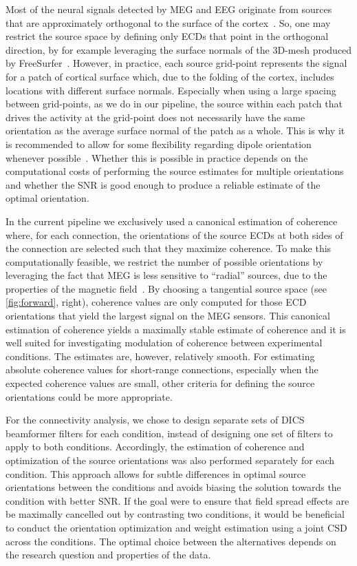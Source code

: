 \documentclass[utf8]{frontiersSCNS}
\renewcommand{\cite}[1]{~\citep{#1}}
\begin{document}
Most of the neural signals detected by MEG and EEG originate from sources that are approximately orthogonal to the surface of the cortex\cite{Hamalainen1993}.
So, one may restrict the source space by defining only ECDs that point in the orthogonal direction, by for example leveraging the surface normals of the 3D-mesh produced by FreeSurfer\cite{Dale1993}.
However, in practice, each source grid-point represents the signal for a patch of cortical surface which, due to the folding of the cortex, includes locations with different surface normals.
Especially when using a large spacing between grid-points, as we do in our pipeline, the source within each patch that drives the activity at the grid-point does not necessarily have the same orientation as the average surface normal of the patch as a whole.
This is why it is recommended to allow for some flexibility regarding dipole orientation whenever possible\cite{Lin2006}.
Whether this is possible in practice depends on the computational costs of performing the source estimates for multiple orientations and whether the SNR is good enough to produce a reliable estimate of the optimal orientation.

In the current pipeline we exclusively used a canonical estimation of coherence\cite{Saarinen2015, Liljestrom2015a, Liljestrom2015b} where, for each connection, the orientations of the source ECDs at both sides of the connection are selected such that they maximize coherence.
To make this computationally feasible, we restrict the number of possible orientations by leveraging the fact that MEG is less sensitive to ``radial'' sources, due to the properties of the magnetic field\cite{Hamalainen1993}.
By choosing a tangential source space (see \autoref{fig:forward}, right), coherence values are only computed for those ECD orientations that yield the largest signal on the MEG sensors.
This canonical estimation of coherence yields a maximally stable estimate of coherence and it is well suited for investigating modulation of coherence between experimental conditions.
The estimates are, however, relatively smooth.
For estimating absolute coherence values for short-range connections, especially when the expected coherence values are small, other criteria for defining the source orientations could be more appropriate.

For the connectivity analysis, we chose to design separate sets of DICS beamformer filters for each condition, instead of designing one set of filters to apply to both conditions.
Accordingly, the estimation of coherence and optimization of the source orientations was also performed separately for each condition.
This approach allows for subtle differences in optimal source orientations between the conditions and avoids biasing the solution towards the condition with better SNR\@.
If the goal were to ensure that field spread effects are be maximally cancelled out by contrasting two conditions, it would be beneficial to conduct the orientation optimization and weight estimation using a joint CSD across the conditions.
The optimal choice between the alternatives depends on the research question and properties of the data.
\end{document}

